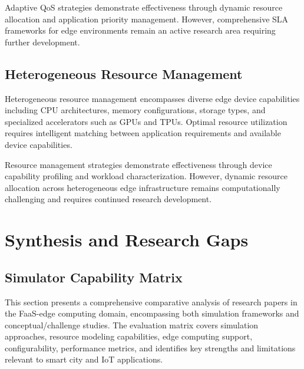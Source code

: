 Adaptive QoS strategies demonstrate effectiveness through dynamic resource allocation and application priority management. However, comprehensive SLA frameworks for edge environments remain an active research area requiring further development.

\subsection{Heterogeneous Resource Management}

Heterogeneous resource management encompasses diverse edge device capabilities including CPU architectures, memory configurations, storage types, and specialized accelerators such as GPUs and TPUs. Optimal resource utilization requires intelligent matching between application requirements and available device capabilities.

Resource management strategies demonstrate effectiveness through device capability profiling and workload characterization. However, dynamic resource allocation across heterogeneous edge infrastructure remains computationally challenging and requires continued research development.

\section{Synthesis and Research Gaps}

\subsection{Simulator Capability Matrix}

This section presents a comprehensive comparative analysis of research papers in the FaaS-edge computing domain, encompassing both simulation frameworks and conceptual/challenge studies. The evaluation matrix covers simulation approaches, resource modeling capabilities, edge computing support, configurability, performance metrics, and identifies key strengths and limitations relevant to smart city and IoT applications.



